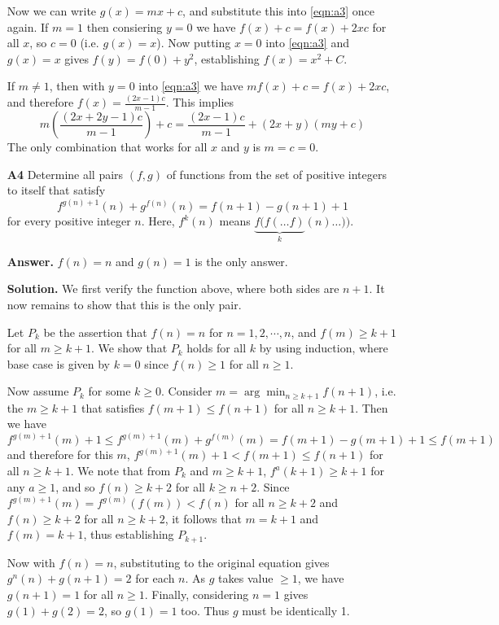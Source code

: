 \documentclass[11pt,a4paper]{article}
\begin{document}
\begin{enumerate}
	Now we can write $g(x)=mx+c$, 
	and substitute this into \ref{eqn:a3} once again. 
	If $m=1$ then consiering $y=0$ we have $f(x)+c=f(x)+2xc$ for all $x$, 
	so $c=0$ (i.e. $g(x)=x$). 
	Now putting $x=0$ into \ref{eqn:a3} and $g(x)=x$ gives $f(y)=f(0)+y^2$, 
	establishing $f(x)=x^2+C$. 
	
	If $m\neq 1$, then with $y=0$ into \ref{eqn:a3} we have $mf(x)+c=f(x)+2xc$, 
	and therefore $f(x)=\frac{(2x-1)c}{m-1}$. 
	This implies 
	\[
	m\left(\frac{(2x+2y-1)c}{m-1}\right)+c
	=\frac{(2x-1)c}{m-1} + (2x+y)(my+c)
	\]
	The only combination that works for all $x$ and $y$ is $m=c=0$. 
	
	\item[\textbf{A4}] 
	Determine all pairs $(f,g)$ of functions from the set of positive integers to itself that satisfy\[f^{g(n)+1}(n) + g^{f(n)}(n) = f(n+1) - g(n+1) + 1\]for every positive integer $n$. Here, $f^k(n)$ means $\underbrace{f(f(\ldots f)}_{k}(n) \ldots ))$.
	
	\textbf{Answer.} $f(n) = n$ and $g(n) = 1$ is the only answer. 
	
	\textbf{Solution.} We first verify the function above, where both sides are $n + 1$. 
	It now remains to show that this is the only pair. 
	
	Let $P_k$ be the assertion that $f(n) = n$ for $n = 1, 2, \cdots, n$, 
	and $f(m)\ge k + 1$ for all $m\ge k + 1$. 
	We show that $P_k$ holds for all $k$ by using induction, 
	where base case is given by $k = 0$ since $f(n)\ge 1$ for all $n\ge 1$. 
	
	Now assume $P_k$ for some $k\ge 0$. 
	Consider $m=\arg\min_{n\ge k + 1} f(n + 1)$, 
	i.e. the $m\ge k + 1$ that satisfies $f(m + 1)\le f(n + 1)$ for all $n\ge k + 1$. 
	Then we have 
	\[
	f^{g(m)+1}(m) + 1
	\le 
	f^{g(m)+1}(m) + g^{f(m)}(m) = f(m+1) - g(m+1) + 1
	\le f(m + 1)
	\]
	and therefore for this $m$, $f^{g(m)+1}(m) + 1 < f(m + 1)\le f(n + 1)$ for all $n\ge k + 1$. 
	We note that from $P_k$ and $m\ge k + 1$, $f^{a}(k + 1)\ge k + 1$ for any $a\ge 1$, 
	and so $f(n)\ge k + 2$ for all $k\ge n + 2$. 
	Since $f^{g(m)+1}(m) = f^{g(m)}(f(m)) < f(n)$ for all $n\ge k + 2$ and $f(n)\ge k + 2$ for all $n\ge k + 2$, 
	it follows that $m = k + 1$ and $f(m) = k + 1$, thus establishing $P_{k + 1}$. 
	
	Now with $f(n) = n$, substituting to the original equation gives 
	$g^{n}(n) + g(n + 1) = 2$ for each $n$. 
	As $g$ takes value $\ge 1$, we have $g(n + 1) = 1$ for all $n\ge 1$. 
	Finally, considering $n = 1$ gives $g(1) + g(2) = 2$, so $g(1) = 1$ too. 
	Thus $g$ must be identically 1. 
	

\end{enumerate}
\end{document}
